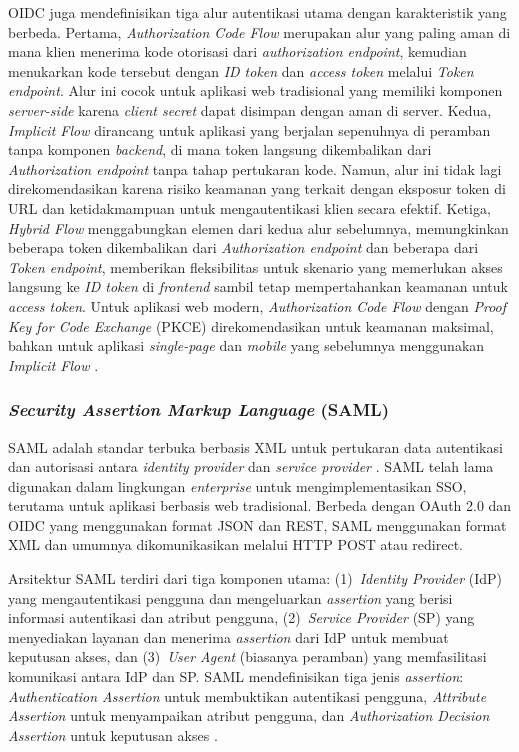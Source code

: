 OIDC juga mendefinisikan tiga alur autentikasi utama dengan karakteristik yang berbeda. Pertama, \textit{Authorization Code Flow} merupakan alur yang paling aman di mana klien menerima kode otorisasi dari \textit{authorization endpoint}, kemudian menukarkan kode tersebut dengan \textit{ID token} dan \textit{access token} melalui \textit{Token endpoint}. Alur ini cocok untuk aplikasi web tradisional yang memiliki komponen \textit{server-side} karena \textit{client secret} dapat disimpan dengan aman di server. Kedua, \textit{Implicit Flow} dirancang untuk aplikasi yang berjalan sepenuhnya di peramban tanpa komponen \textit{backend}, di mana token langsung dikembalikan dari \textit{Authorization endpoint} tanpa tahap pertukaran kode. Namun, alur ini tidak lagi direkomendasikan karena risiko keamanan yang terkait dengan eksposur token di URL dan ketidakmampuan untuk mengautentikasi klien secara efektif. Ketiga, \textit{Hybrid Flow} menggabungkan elemen dari kedua alur sebelumnya, memungkinkan beberapa token dikembalikan dari \textit{Authorization endpoint} dan beberapa dari \textit{Token endpoint}, memberikan fleksibilitas untuk skenario yang memerlukan akses langsung ke \textit{ID token} di \textit{frontend} sambil tetap mempertahankan keamanan untuk \textit{access token}. Untuk aplikasi web modern, \textit{Authorization Code Flow} dengan \textit{Proof Key for Code Exchange} (PKCE) direkomendasikan untuk keamanan maksimal, bahkan untuk aplikasi \textit{single-page} dan \textit{mobile} yang sebelumnya menggunakan \textit{Implicit Flow} \citep{Bradley_2025_OAuth2Browsers}.

\subsubsection{\textit{Security Assertion Markup Language} (SAML)}

SAML adalah standar terbuka berbasis XML untuk pertukaran data autentikasi dan autorisasi antara \textit{identity provider} dan \textit{service provider} \citep{Hughes_2005_SAMLProfiles}. SAML telah lama digunakan dalam lingkungan \textit{enterprise} untuk mengimplementasikan SSO, terutama untuk aplikasi berbasis web tradisional. Berbeda dengan OAuth 2.0 dan OIDC yang menggunakan format JSON dan REST, SAML menggunakan format XML dan umumnya dikomunikasikan melalui HTTP POST atau redirect.

Arsitektur SAML terdiri dari tiga komponen utama: (1)~\textit{Identity Provider} (IdP) yang mengautentikasi pengguna dan mengeluarkan \textit{assertion} yang berisi informasi autentikasi dan atribut pengguna, (2)~\textit{Service Provider} (SP) yang menyediakan layanan dan menerima \textit{assertion} dari IdP untuk membuat keputusan akses, dan (3)~\textit{User Agent} (biasanya peramban) yang memfasilitasi komunikasi antara IdP dan SP. SAML mendefinisikan tiga jenis \textit{assertion}: \textit{Authentication Assertion} untuk membuktikan autentikasi pengguna, \textit{Attribute Assertion} untuk menyampaikan atribut pengguna, dan \textit{Authorization Decision Assertion} untuk keputusan akses \citep{Cantor_2008_SAMLBindings}.

